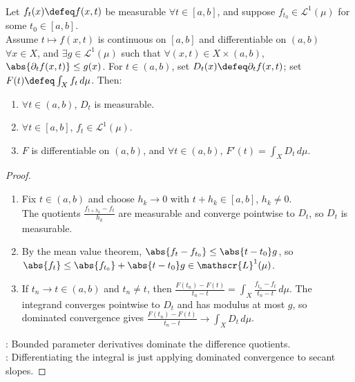\begin{theorem} \label{thm:differentiation-under-lebesgue-integral} \\
Let $f_t(x)\defeq f(x,t)$ be measurable $\forall t\in[a,b]$, and suppose $f_{t_0}\in\mathscr{L}^1(\mu)$ for some $t_0\in[a,b]$.\\
Assume $t\mapsto f(x,t)$ is continuous on $[a,b]$ and differentiable on $(a,b)$ $\forall x\in X$, and $\exists g\in\mathscr{L}^1(\mu)$ such that $\forall(x,t)\in X\times(a,b)$, $\abs{\partial_tf(x,t)}\leq g(x)$. For $t\in(a,b)$, set $D_t(x)\defeq\partial_tf(x,t)$; set $F(t)\defeq\int_Xf_t\,d\mu$. Then:
\begin{enumerate}[label=(\roman*)]
\setlength{\itemsep}{0pt}
\item $\forall t\in(a,b)$, $D_t$ is measurable.
\item $\forall t\in[a,b]$, $f_t\in\mathscr{L}^1(\mu)$.
\item $F$ is differentiable on $(a,b)$, and $\forall t\in(a,b)$, $F'(t)=\int_XD_t\,d\mu$.
\end{enumerate}
\begin{proof}
\begin{enumerate}[label=(\roman*)]
\setlength{\itemsep}{0pt}
\item Fix $t\in(a,b)$ and choose $h_k\to0$ with $t+h_k\in[a,b]$, $h_k\neq0$.\\
The quotients $\frac{f_{t+h_k}-f_t}{h_k}$ are measurable and converge pointwise to $D_t$, so $D_t$ is measurable.
\item By the mean value theorem, $\abs{f_t-f_{t_0}}\leq \abs{t-t_0}g$, so $\abs{f_t}\leq\abs{f_{t_0}}+\abs{t-t_0}g\in\mathscr{L}^1(\mu)$.
\item If $t_n\to t\in(a,b)$ and $t_n\neq t$, then $\frac{F(t_n)-F(t)}{t_n-t}=\int_X\frac{f_{t_n}-f_t}{t_n-t}\,d\mu$. The integrand converges pointwise to $D_t$ and has modulus at most $g$, so dominated convergence gives $\frac{F(t_n)-F(t)}{t_n-t}\to\int_XD_t\,d\mu$.
\end{enumerate}
: Bounded parameter derivatives dominate the difference quotients.\\
: Differentiating the integral is just applying dominated convergence to secant slopes.
\end{proof}
\end{theorem}

